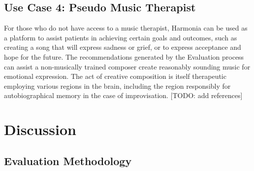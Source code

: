 \documentclass[final,authoryear,5p,times,twocolumn]{elsarticle}
\begin{document}
\subsection{Use Case 4: Pseudo Music Therapist}

For those who do not have access to a music therapist, Harmonia can be used as a platform to assist patients in achieving certain goals and outcomes, such as creating a song that will express sadness or grief, or to express acceptance and hope for the future. The recommendations generated by the Evaluation process can assist a non-musically trained composer create reasonably sounding music for emotional expression. The act of creative composition is itself therapeutic employing various regions in the brain, including the region responsibly for autobiographical memory in the case of improvisation. [TODO: add references]

\section{Discussion}

\subsection{Evaluation Methodology}




\end{document}
